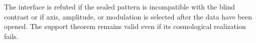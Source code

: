 \begin{criterion}
\label{crit:anisotropia-dodecafasica}
The interface is refuted if the sealed pattern is incompatible with the
blind contrast or if axis, amplitude, or modulation is selected after
the data have been opened. The support theorem remains valid even if its
cosmological realization fails.
\end{criterion}
